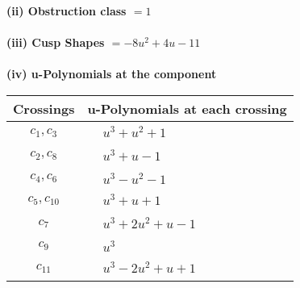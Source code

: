 \documentclass[1p]{elsarticle_modified}
\theoremstyle{definition}
\begin{document}
\flushleft \textbf{(ii) Obstruction class $= 1$}\\~\\
\flushleft \textbf{(iii) Cusp Shapes $= -8 u^2+4 u-11$}\\~\\
\newpage\renewcommand{\arraystretch}{1}
\flushleft \textbf{(iv) u-Polynomials at the component}\newline \\
\begin{tabular}{m{50pt}|m{274pt}}
Crossings & \hspace{64pt}u-Polynomials at each crossing \\
\hline $$\begin{aligned}c_{1},c_{3}\end{aligned}$$&$\begin{aligned}
&u^3+u^2+1
\end{aligned}$\\
\hline $$\begin{aligned}c_{2},c_{8}\end{aligned}$$&$\begin{aligned}
&u^3+u-1
\end{aligned}$\\
\hline $$\begin{aligned}c_{4},c_{6}\end{aligned}$$&$\begin{aligned}
&u^3- u^2-1
\end{aligned}$\\
\hline $$\begin{aligned}c_{5},c_{10}\end{aligned}$$&$\begin{aligned}
&u^3+u+1
\end{aligned}$\\
\hline $$\begin{aligned}c_{7}\end{aligned}$$&$\begin{aligned}
&u^3+2 u^2+u-1
\end{aligned}$\\
\hline $$\begin{aligned}c_{9}\end{aligned}$$&$\begin{aligned}
&u^3
\end{aligned}$\\
\hline $$\begin{aligned}c_{11}\end{aligned}$$&$\begin{aligned}
&u^3-2 u^2+u+1
\end{aligned}$\\
\hline
\end{tabular}\\~\\
\end{document}
